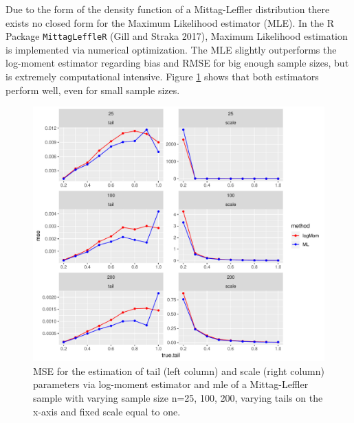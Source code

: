 \documentclass[]{elsarticle} %
\begin{document}
Due to the form of the density function of a Mittag-Leffler distribution
there exists no closed form for the Maximum Likelihood estimator (MLE).
In the R Package \texttt{MittagLeffleR} (Gill and Straka 2017), Maximum
Likelihood estimation is implemented via numerical optimization. The MLE
slightly outperforms the log-moment estimator regarding bias and RMSE
for big enough sample sizes, but is extremely computational intensive.
Figure \ref{fig:MSE} shows that both estimators perform well, even for
small sample sizes.

\begin{figure}

{\centering \includegraphics[width=0.9\linewidth]{article_springer_files/figure-latex/MSE-1} 

}

\caption{\label{fig:MSE} MSE for the estimation of tail (left column) and scale (right column) parameters via log-moment estimator and mle of a Mittag-Leffler sample with varying sample size n=25, 100, 200, varying tails on the x-axis and fixed scale equal to one.}\label{fig:MSE}
\end{figure}
\end{document}
